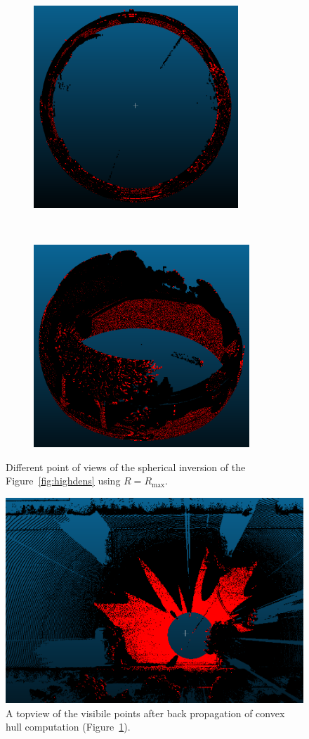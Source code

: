 \begin{figure}[t!]
  \centering
    \begin{subfigure}[t]{0.5\textwidth}
      \centering
	\includegraphics[height=3in]{img/hpr1.png}
    \end{subfigure}%
    ~
    \begin{subfigure}[t]{0.5\textwidth}
      \centering
	\includegraphics[height=3in]{img/hpr2.png}
    \end{subfigure}
    \caption{Different point of views of the spherical inversion of the Figure~\ref{fig:highdens} using $R = R_\text{max}$.}
    \label{fig:hpr1}
\end{figure}
\begin{figure}
  \centering
  \includegraphics[scale=0.6]{img/hpr4.png}
  \caption{A topview of the visibile points after back propagation of convex hull computation (Figure~\ref{fig:hpr1}).}
  \label{fig:hpr4}
\end{figure}
